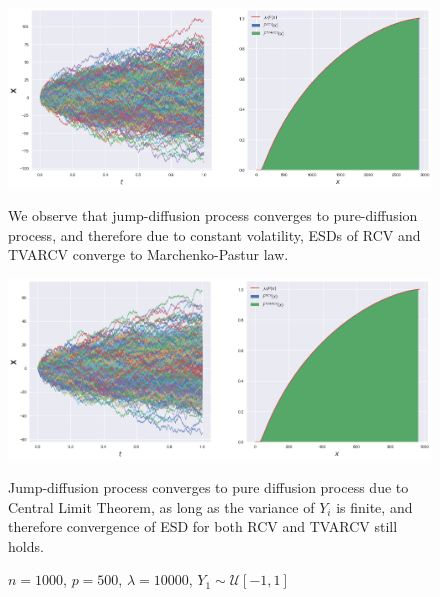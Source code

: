 \documentclass[a4paper,11pt]{book}
\theoremstyle{plain}
\theoremstyle{definition}
\begin{document}
    \begin{figure}
       	\begin{center} \centering
       		\includegraphics[scale=0.4]{XCompound}
       		\caption{$n = 1000$, $p = 500$, $\lambda = 10000$, $Y_1 \sim \mathcal{N}(0, 1)$}
       		\smallskip
       		\small
       		We observe that jump-diffusion process converges to pure-diffusion process, and therefore due to constant volatility, ESDs of RCV and TVARCV converge to Marchenko-Pastur law.
       	\end{center}
       	\begin{center} \centering
       		\includegraphics[scale=0.4]{XCompounduni}
       		\caption{$n = 1000$, $p = 500$, $\lambda = 10000$, $Y_1 \sim \mathcal{U}[-1, 1]$}
       		\smallskip
       		\small
       		Jump-diffusion process converges to pure diffusion process due to Central Limit Theorem, as long as the variance of $Y_i$ is finite, and therefore convergence of ESD for both RCV and TVARCV still holds.
       	\end{center}
    \end{figure}
    
\end{document}
